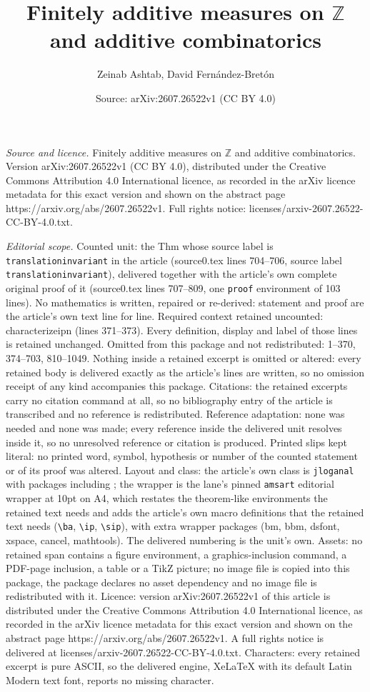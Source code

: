 \documentclass[10pt,a4paper]{amsart}
\title[Finitely additive measures on $\mathbb Z$ and additive combi]{Finitely additive measures on $\mathbb Z$ and additive combinatorics}
\author{Zeinab Ashtab, David Fern\'andez-Bret\'on}
\date{Source: arXiv:2607.26522v1 (CC BY 4.0)}
\begin{document}
\maketitle

\noindent\emph{Source and licence.} Finitely additive measures on $\mathbb Z$ and additive combinatorics. Version arXiv:2607.26522v1 (CC BY 4.0), distributed under the Creative Commons Attribution 4.0 International licence, as recorded in the arXiv licence metadata for this exact version and shown on the abstract page https://arxiv.org/abs/2607.26522v1. Full rights notice: licenses/arxiv-2607.26522-CC-BY-4.0.txt.\par\smallskip

\noindent\textit{Editorial scope.} Counted unit: the Thm whose source label is \texttt{translationinvariant} in the article (source0.tex lines 704--706, source label \texttt{translationinvariant}), delivered together with the article's own complete original proof of it (source0.tex lines 707--809, one \texttt{proof} environment of 103 lines). No mathematics is written, repaired or re-derived: statement and proof are the article's own text line for line. Required context retained uncounted: characterizeipn (lines 371--373). Every definition, display and label of those lines is retained unchanged. Omitted from this package and not redistributed: 1--370, 374--703, 810--1049. Nothing inside a retained excerpt is omitted or altered: every retained body is delivered exactly as the article's lines are written, so no omission receipt of any kind accompanies this package. Citations: the retained excerpts carry no citation command at all, so no bibliography entry of the article is transcribed and no reference is redistributed. Reference adaptation: none was needed and none was made; every reference inside the delivered unit resolves inside it, so no unresolved reference or citation is produced. Printed slips kept literal: no printed word, symbol, hypothesis or number of the counted statement or of its proof was altered. Layout and class: the article's own class is \texttt{jloganal} with packages including ; the wrapper is the lane's pinned \texttt{amsart} editorial wrapper at 10pt on A4, which restates the theorem-like environments the retained text needs and adds the article's own macro definitions that the retained text needs (\texttt{\textbackslash ba}, \texttt{\textbackslash ip}, \texttt{\textbackslash sip}), with extra wrapper packages (bm, bbm, dsfont, xspace, cancel, mathtools). The delivered numbering is the unit's own. Assets: no retained span contains a figure environment, a graphics-inclusion command, a PDF-page inclusion, a table or a TikZ picture; no image file is copied into this package, the package declares no asset dependency and no image file is redistributed with it. Licence: version arXiv:2607.26522v1 of this article is distributed under the Creative Commons Attribution 4.0 International licence, as recorded in the arXiv licence metadata for this exact version and shown on the abstract page https://arxiv.org/abs/2607.26522v1. A full rights notice is delivered at licenses/arxiv-2607.26522-CC-BY-4.0.txt. Characters: every retained excerpt is pure ASCII, so the delivered engine, XeLaTeX with its default Latin Modern text font, reports no missing character.
\end{document}
